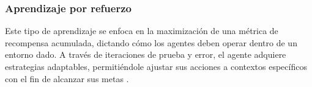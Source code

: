 \subsubsection{Aprendizaje por refuerzo}

Este tipo de aprendizaje se enfoca en la maximización de una métrica de recompensa acumulada, dictando cómo los agentes deben operar dentro de un entorno dado. A través de iteraciones de prueba y error, el agente adquiere estrategias adaptables, permitiéndole ajustar sus acciones a contextos específicos con el fin de alcanzar sus metas \cite{geron2019hands}.
